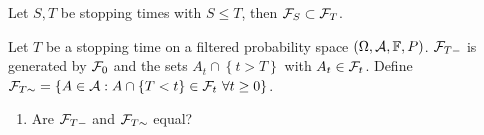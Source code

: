  Let $S, T$ be
stopping times with $S\leq T$, then $\mathcal F_{S} \subset \mathcal F_{T}$.

\solution

Let $T$ be a stopping time on a filtered probability space $(\Omega,\mathcal A, \mathbb F,
P)$.  $\mathcal F_{T-}$ is generated by $\mathcal F_0$ and the sets $A_{t} \cap \left\{ {t>T}
\right\}$ with $A_t \in \mathcal F_t$.  Define $\mathcal F_{T\sim} = \left\{ A \in \mathcal A : A
\cap \left\{ T <t \right\} \in\mathcal F_{t} \ \forall t\geq 0 \right\}$. 
\begin{enumerate}
    \item Are $\mathcal F_{T-}$ and $\mathcal F_{T\sim}$ equal?
\end{enumerate}



